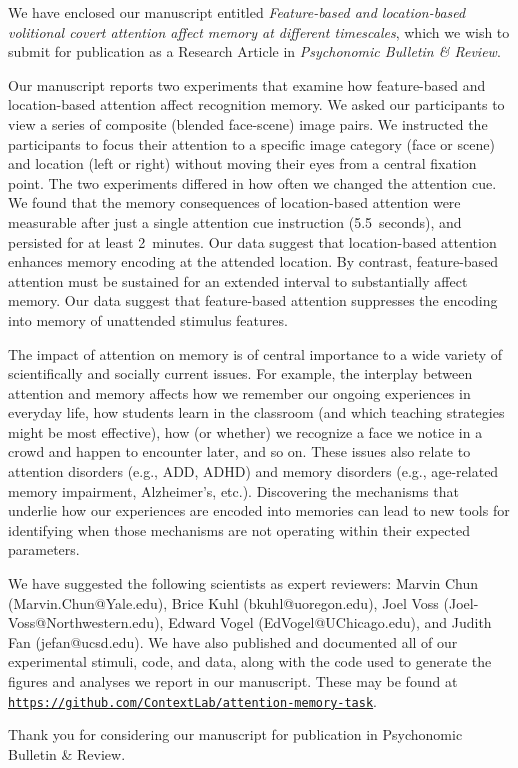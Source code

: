 \documentclass[10pt,stdletter,orderfromtodate,sigleft]{newlfm}
\begin{document}
\begin{newlfm}
We have enclosed our manuscript entitled \textit{Feature-based and
  location-based volitional covert attention affect memory at different timescales}, which we wish
to submit for publication as a Research Article in
\textit{Psychonomic Bulletin \& Review}.

Our manuscript reports two experiments that examine how feature-based
and location-based attention affect recognition memory.  We asked our
participants to view a series of composite (blended face-scene) image
pairs.  We instructed the participants to focus their attention to a
specific image category (face or scene) and location (left or right)
without moving their eyes from a central fixation point.  The two
experiments differed in how often we changed the attention cue.  We
found that the memory consequences of location-based attention were
measurable after just a single attention cue instruction
(5.5~seconds), and persisted for at least 2~minutes.  Our data suggest
that location-based attention enhances memory encoding at the attended
location.  By contrast, feature-based attention must be sustained for
an extended interval to substantially affect memory.  Our data suggest
that feature-based attention suppresses the encoding into memory of
unattended stimulus features.

The impact of attention on memory is of central importance to a wide
variety of scientifically and socially current issues.  For example,
the interplay between attention and memory affects how we remember our
ongoing experiences in everyday life, how students learn in the
classroom (and which teaching strategies might be most effective), how
(or whether) we recognize a face we notice in a crowd and
happen to encounter later, and so on.  These issues also relate to
attention disorders (e.g., ADD, ADHD) and memory disorders
(e.g., age-related memory impairment, Alzheimer's, etc.).  Discovering
the mechanisms that underlie how our experiences are encoded into
memories can lead to new tools for identifying when those mechanisms
are not operating within their expected parameters.

We have suggested the following scientists as expert reviewers: Marvin
Chun (Marvin.Chun@Yale.edu), Brice Kuhl (bkuhl@uoregon.edu), Joel Voss (Joel-Voss@Northwestern.edu),
Edward Vogel (Ed\-Vogel@UChi\-ca\-go.edu), and Judith Fan
(jefan@ucsd.edu).  We have also published and documented all of our
experimental stimuli, code, and data, along with the code used to
generate the figures and analyses we report in our manuscript.  These
may be found at
\href{https://github.com/ContextLab/attention-memory-task}{\texttt{https://github.com/ContextLab/attention-memory-task}}.

Thank you for considering our manuscript for publication in
Psychonomic Bulletin \& Review.

\end{newlfm}
\end{document}
